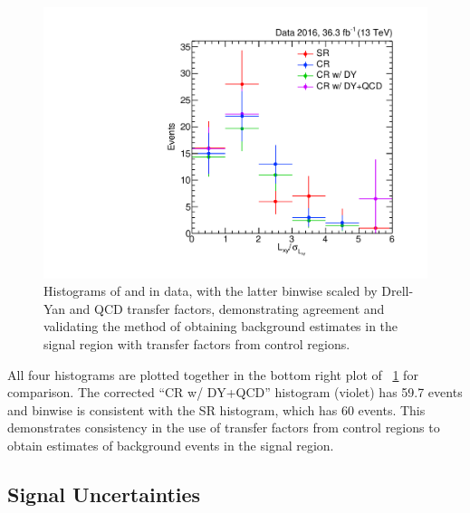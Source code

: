\begin{figure}[htbp]
  \hspace*{-2em}
  \includegraphics[width=\DSquareWidth]{figures/displaced/BGEST_smallLxySig.pdf}
  \caption{Histograms of  and  in data, with the latter binwise scaled by Drell-Yan and QCD transfer factors, demonstrating agreement and validating the method of obtaining background estimates in the signal region with transfer factors from control regions.}
  \label{fig:dd:TFLess}
\end{figure}
\clearpage

All four histograms are plotted together in the bottom right plot of \Fig~\ref{fig:dd:TFLess} for comparison.
The corrected ``CR w/ DY+QCD'' histogram (violet) has 59.7 events and binwise is consistent with the SR histogram, which has 60 events.
This demonstrates consistency in the use of transfer factors from control regions to obtain estimates of background events in the signal region.

\subsection{Signal Uncertainties}
